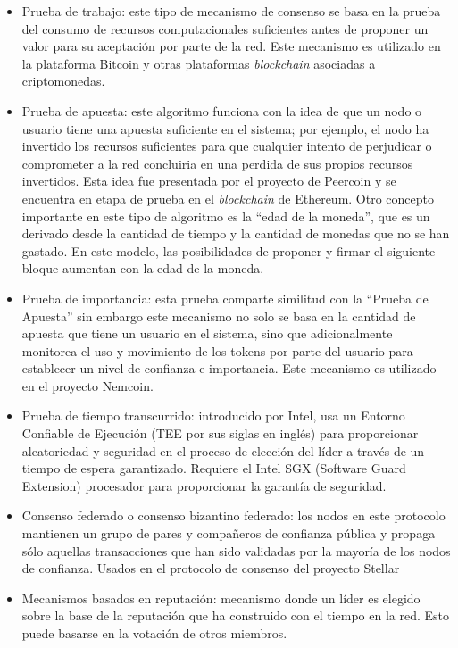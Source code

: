 \begin{itemize}
\item Prueba de trabajo: este tipo de mecanismo de consenso se basa en la prueba del consumo de recursos computacionales suficientes  antes de proponer un valor para su aceptación por parte de la red. Este mecanismo es utilizado en la plataforma Bitcoin  y otras plataformas \textit{blockchain} asociadas a criptomonedas.
\item Prueba de apuesta: este algoritmo funciona con la idea de que un nodo o usuario tiene una apuesta suficiente en el sistema; por ejemplo, el nodo ha invertido los recursos suficientes  para que cualquier intento de  perjudicar o comprometer a la red concluiria en una perdida de sus propios recursos invertidos. Esta idea fue presentada por el proyecto de Peercoin y se encuentra en etapa de prueba  en el \textit{blockchain} de Ethereum. Otro concepto importante en este tipo de algoritmo es la “edad de la moneda”, que es un derivado desde la cantidad de tiempo y la cantidad de monedas que no se han gastado. En este modelo, las posibilidades de proponer y firmar el siguiente bloque aumentan con la edad de la moneda.
\item Prueba de importancia: esta prueba comparte similitud con la “Prueba de Apuesta” sin embargo este mecanismo no solo se basa en la cantidad de  apuesta que tiene un usuario en el sistema, sino que adicionalmente monitorea el uso y movimiento de los tokens por parte del usuario para establecer un nivel de confianza e importancia. Este mecanismo es utilizado en el proyecto Nemcoin.
\item Prueba de tiempo transcurrido: introducido por Intel, usa un Entorno Confiable de Ejecución (TEE por sus siglas en inglés) para proporcionar aleatoriedad y seguridad en el proceso de elección del líder a través de un tiempo de espera garantizado. Requiere el Intel SGX (Software Guard Extension) procesador para proporcionar la garantía de seguridad\cite{costan2016intel}.
\item Consenso federado o consenso bizantino federado: los nodos en este protocolo mantienen un grupo de pares y compañeros de confianza pública y propaga sólo aquellas transacciones que han sido validadas por la mayoría de los nodos de confianza. Usados en el protocolo de consenso del proyecto Stellar\cite{stellarProject:stellarBasics}
\item Mecanismos basados  en reputación: mecanismo donde un líder es elegido sobre la base de la reputación que ha construido con el tiempo en la red. Esto puede basarse en la votación de otros miembros.
\end{itemize}

